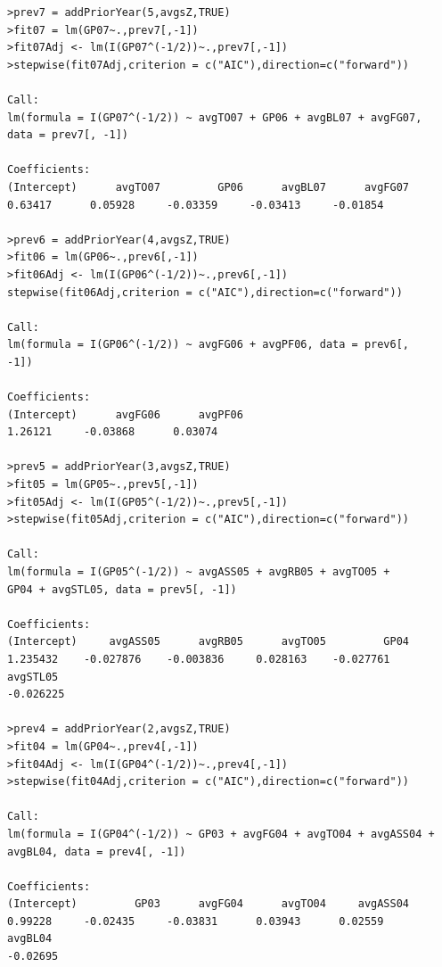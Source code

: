 \documentclass[]{scrartcl}
\begin{document}
\begin{verbatim}
>prev7 = addPriorYear(5,avgsZ,TRUE)
>fit07 = lm(GP07~.,prev7[,-1])
>fit07Adj <- lm(I(GP07^(-1/2))~.,prev7[,-1])
>stepwise(fit07Adj,criterion = c("AIC"),direction=c("forward"))

Call:
lm(formula = I(GP07^(-1/2)) ~ avgTO07 + GP06 + avgBL07 + avgFG07, 
data = prev7[, -1])

Coefficients:
(Intercept)      avgTO07         GP06      avgBL07      avgFG07  
0.63417      0.05928     -0.03359     -0.03413     -0.01854  

>prev6 = addPriorYear(4,avgsZ,TRUE)
>fit06 = lm(GP06~.,prev6[,-1])
>fit06Adj <- lm(I(GP06^(-1/2))~.,prev6[,-1])
stepwise(fit06Adj,criterion = c("AIC"),direction=c("forward"))

Call:
lm(formula = I(GP06^(-1/2)) ~ avgFG06 + avgPF06, data = prev6[, 
-1])

Coefficients:
(Intercept)      avgFG06      avgPF06  
1.26121     -0.03868      0.03074  

>prev5 = addPriorYear(3,avgsZ,TRUE)
>fit05 = lm(GP05~.,prev5[,-1])
>fit05Adj <- lm(I(GP05^(-1/2))~.,prev5[,-1])
>stepwise(fit05Adj,criterion = c("AIC"),direction=c("forward"))

Call:
lm(formula = I(GP05^(-1/2)) ~ avgASS05 + avgRB05 + avgTO05 + 
GP04 + avgSTL05, data = prev5[, -1])

Coefficients:
(Intercept)     avgASS05      avgRB05      avgTO05         GP04  
1.235432    -0.027876    -0.003836     0.028163    -0.027761  
avgSTL05  
-0.026225  

>prev4 = addPriorYear(2,avgsZ,TRUE)
>fit04 = lm(GP04~.,prev4[,-1])
>fit04Adj <- lm(I(GP04^(-1/2))~.,prev4[,-1])
>stepwise(fit04Adj,criterion = c("AIC"),direction=c("forward"))

Call:
lm(formula = I(GP04^(-1/2)) ~ GP03 + avgFG04 + avgTO04 + avgASS04 + 
avgBL04, data = prev4[, -1])

Coefficients:
(Intercept)         GP03      avgFG04      avgTO04     avgASS04  
0.99228     -0.02435     -0.03831      0.03943      0.02559  
avgBL04  
-0.02695  
\end{verbatim}
\end{document}
